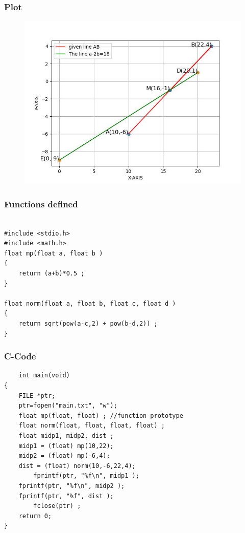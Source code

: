 \documentclass{beamer}
\begin{document}
\begin{frame}
\frametitle{Plot}
\begin{figure}
    \centering
    \includegraphics[width=0.7\linewidth]{figs/value.jpg}
    \caption{}
    \label{fig:enter-label}
\end{figure}
\end{frame}
\begin{frame}[fragile]
\frametitle{Functions defined}
\begin{verbatim}

#include <stdio.h>
#include <math.h>
float mp(float a, float b )
{
	return (a+b)*0.5 ;
}

float norm(float a, float b, float c, float d )
{
    return sqrt(pow(a-c,2) + pow(b-d,2)) ;
}

\end{verbatim}
\end{frame}
\begin{frame}[fragile]
\frametitle{C-Code}
\begin{verbatim}
    int main(void)
{
	FILE *ptr; 
	ptr=fopen("main.txt", "w");
	float mp(float, float) ; //function prototype
	float norm(float, float, float, float) ;
	float midp1, midp2, dist ;
	midp1 = (float) mp(10,22);
	midp2 = (float) mp(-6,4);
	dist = (float) norm(10,-6,22,4);
        fprintf(ptr, "%f\n", midp1 ); 
	fprintf(ptr, "%f\n", midp2 );
	fprintf(ptr, "%f", dist );
        fclose(ptr) ;
	return 0;
}
\end{verbatim}
\end{frame}
\end{document}
